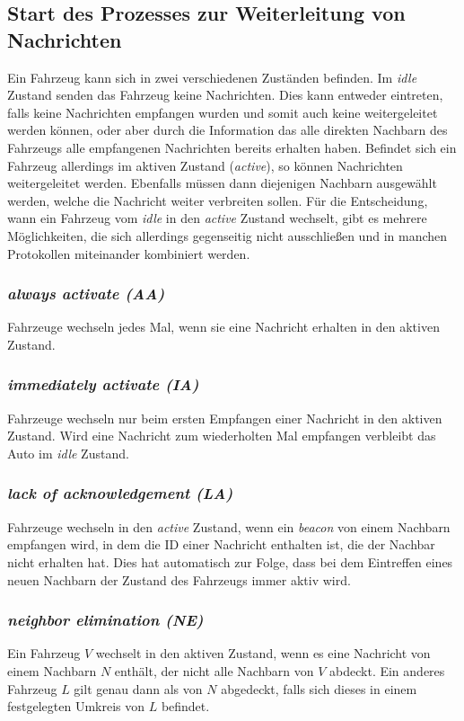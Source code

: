 \documentclass[english,runningheads,a4paper]{llncs}[2018/03/10]
\begin{document}
\subsection{Start des Prozesses zur Weiterleitung von Nachrichten}\label{subsec:forwarder-selection}
Ein Fahrzeug kann sich in zwei verschiedenen Zuständen befinden.
Im \textit{idle} Zustand senden das Fahrzeug keine Nachrichten.
Dies kann entweder eintreten, falls keine Nachrichten empfangen wurden und somit auch keine weitergeleitet werden können, oder aber durch die Information das alle direkten Nachbarn des Fahrzeugs alle empfangenen Nachrichten bereits erhalten haben.
Befindet sich ein Fahrzeug allerdings im aktiven Zustand (\textit{active}), so können Nachrichten weitergeleitet werden.
Ebenfalls müssen dann diejenigen Nachbarn ausgewählt werden, welche die Nachricht weiter verbreiten sollen.
Für die Entscheidung, wann ein Fahrzeug vom \textit{idle} in den \textit{active} Zustand wechselt, gibt es mehrere Möglichkeiten, die sich allerdings gegenseitig nicht ausschließen und in manchen Protokollen miteinander kombiniert werden.
\subsubsection{\textit{always activate (AA)}}
Fahrzeuge wechseln jedes Mal, wenn sie eine Nachricht erhalten in den aktiven Zustand.
\subsubsection{\textit{immediately activate (IA)}}
Fahrzeuge wechseln nur beim ersten Empfangen einer Nachricht in den aktiven Zustand.
Wird eine Nachricht zum wiederholten Mal empfangen verbleibt das Auto im \textit{idle} Zustand.
\subsubsection{\textit{lack of acknowledgement (LA)}}
Fahrzeuge wechseln in den \textit{active} Zustand, wenn ein \textit{beacon} von einem Nachbarn empfangen wird, in dem die ID einer Nachricht enthalten ist, die der Nachbar nicht erhalten hat.
Dies hat automatisch zur Folge, dass bei dem Eintreffen eines neuen Nachbarn der Zustand des Fahrzeugs immer aktiv wird.
\subsubsection{\textit{neighbor elimination (NE)}}
Ein Fahrzeug $V$ wechselt in den aktiven Zustand, wenn es eine Nachricht von einem Nachbarn $N$ enthält, der nicht alle Nachbarn von $V$ abdeckt.
Ein anderes Fahrzeug $L$ gilt genau dann als von $N$ abgedeckt, falls sich dieses in einem festgelegten Umkreis von $L$ befindet\cite{conti2013mobile}.
\end{document}
